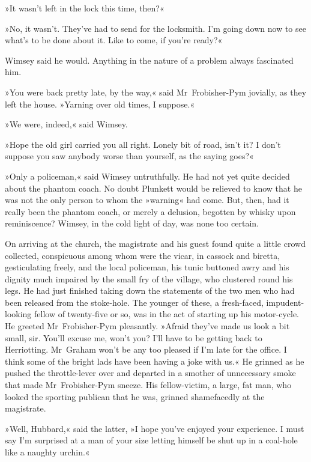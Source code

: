 »It wasn't left in the lock this time, then?«

»No, it wasn't. They've had to send for the locksmith. I'm going down now to see what's to be done about it. Like to come, if you're ready?«

Wimsey said he would. Anything in the nature of a problem always fascinated him.

»You were back pretty late, by the way,« said Mr~Frobisher-Pym jovially, as they left the house. »Yarning over old times, I suppose.«

»We were, indeed,« said Wimsey.

»Hope the old girl carried you all right. Lonely bit of road, isn't it? I don't suppose you saw anybody worse than yourself, as the saying goes?«

»Only a policeman,« said Wimsey untruthfully. He had not yet quite decided about the phantom coach. No doubt Plunkett would be relieved to know that he was not the only person to whom the »warning« had come. But, then, had it really been the phantom coach, or merely a delusion, begotten by whisky upon reminiscence? Wimsey, in the cold light of day, was none too certain.

On arriving at the church, the magistrate and his guest found quite a little crowd collected, conspicuous among whom were the vicar, in cassock and biretta, gesticulating freely, and the local policeman, his tunic buttoned awry and his dignity much impaired by the small fry of the village, who clustered round his legs. He had just finished taking down the statements of the two men who had been released from the stoke-hole. The younger of these, a fresh-faced, impudent-looking fellow of twenty-five or so, was in the act of starting up his motor-cycle. He greeted Mr~Frobisher-Pym pleasantly. »Afraid they've made us look a bit small, sir. You'll excuse me, won't you? I'll have to be getting back to Herriotting. Mr~Graham won't be any too pleased if I'm late for the office. I think some of the bright lads have been having a joke with us.« He grinned as he pushed the throttle-lever over and departed in a smother of unnecessary smoke that made Mr~Frobisher-Pym sneeze. His fellow-victim, a large, fat man, who looked the sporting publican that he was, grinned shamefacedly at the magistrate.

»Well, Hubbard,« said the latter, »I hope you've enjoyed your experience. I must say I'm surprised at a man of your size letting himself be shut up in a coal-hole like a naughty urchin.«

